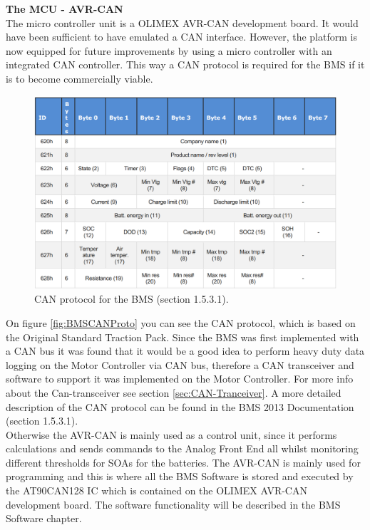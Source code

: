 \textbf{The MCU - AVR-CAN}\\
The micro controller unit is a OLIMEX AVR-CAN development board\cite{BMSAVRCAN}. It would have been sufficient to have emulated a CAN interface. However, the platform is now equipped for future improvements by using a micro controller with an integrated CAN controller. This way a CAN protocol is required for the BMS if it is to become commercially viable.

\begin{figure}[H]
	\centering
	\includegraphics[width=1.0\linewidth]{Hardware/Pictures/BMSCANProto}
	\caption[Empty]{CAN protocol for the BMS \cite{BMSDocumentation} (section 1.5.3.1).}
	\label{fig:BMSCANProto}
\end{figure}

On figure \vref{fig:BMSCANProto} you can see the CAN protocol, which is based on the Original Standard Traction Pack. Since the BMS was first implemented with a CAN bus it was found that it would be a good idea to perform heavy duty data logging on the Motor Controller via CAN bus, therefore a CAN transceiver and software to support it was implemented on the Motor Controller. For more info about the Can-transceiver see section \vref{sec:CAN-Tranceiver}. A more detailed description of the CAN protocol can be found in the BMS 2013 Documentation \cite{BMSDocumentation} (section 1.5.3.1).\\
Otherwise the AVR-CAN is mainly used as a control unit, since it performs calculations and sends commands to the Analog Front End all whilst monitoring different thresholds for SOAs for the batteries. The AVR-CAN is mainly used for programming and this is where all the BMS Software is stored and executed by the AT90CAN128 IC which is contained on the OLIMEX AVR-CAN development board. The software functionality will be described in the BMS Software chapter.

